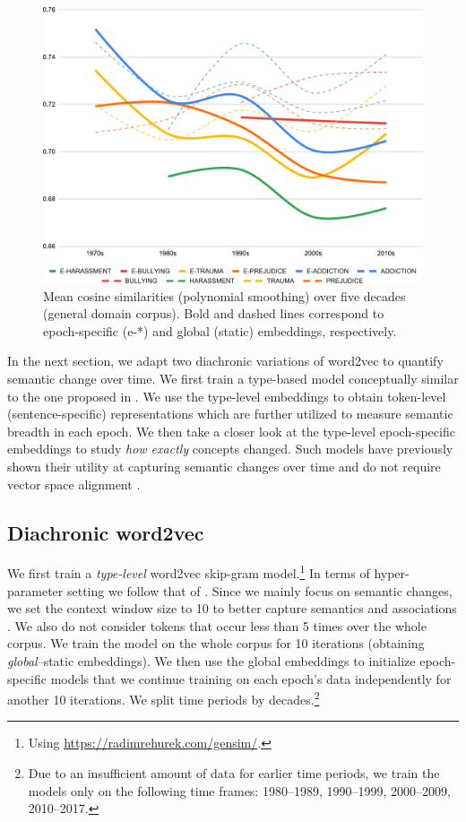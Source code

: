 \documentclass[output=paper]{langsci/langscibook}
\begin{document}
\begin{figure}[p]
  \includegraphics[width=.8\textwidth]{figures/VYLOMOVA_context-sim-coca.pdf}
\caption{Mean cosine similarities (polynomial smoothing) over five decades (general domain corpus). Bold and dashed lines correspond to epoch-specific (e-*) and global (static) embeddings, respectively.\label{fig:avg-cos-sim-cocha}}
\end{figure}


In the next section, we adapt two diachronic variations of word2vec \citep{mikolov2013-distributed} to quantify semantic change over time.
We first train a type-based model conceptually similar to the one proposed in \citet{mendelsohn2020framework}. We use the type-level embeddings to obtain token-level (sentence-specific) representations which are further utilized to measure semantic breadth in each epoch. We then take a closer look at the type-level epoch-specific embeddings to study \emph{how exactly} concepts changed. Such models have previously shown their utility at capturing semantic changes over time \citep{tahmasebi2018survey,kutuzov-etal-2018-diachronic} and do not require vector space alignment \citep[which, as has been previously shown, leads to noise;][]{dubossarsky-etal-2019-time}.  


\subsection{Diachronic word2vec}
We first train a \emph{type-level} word2vec skip-gram model.\footnote{Using \url{https://radimrehurek.com/gensim/}.} In terms of hyper-param\-e\-ter setting we follow that of \citet{mendelsohn2020framework}. Since we mainly focus on semantic changes, we set the context window size to 10 to better capture semantics and associations \citep{agirre2009study}. We also do not consider tokens that occur less than 5 times over the whole corpus. We train the model on the whole corpus for 10 iterations (obtaining \emph{global}--static embeddings). We then use the global embeddings to initialize epoch-specific models that we continue training on each epoch's data independently for another 10 iterations. We split time periods by decades.\footnote{Due to an insufficient amount of data for earlier time periods, we train the models only on the following time frames: 1980--1989, 1990--1999, 2000--2009, 2010--2017.}   
\end{document}
